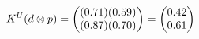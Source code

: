 \documentclass[preview]{standalone}
\begin{document}
\begin{align*}
\special{dvisvgm:raw <g id='unique000'>}K^U(d \otimes p) = \begin{pmatrix} (0.71)(0.59) \\ (0.87)(0.70) \end{pmatrix} = \begin{pmatrix} 0.42 \\ 0.61 \end{pmatrix}\special{dvisvgm:raw </g>}
\end{align*}
\end{document}
